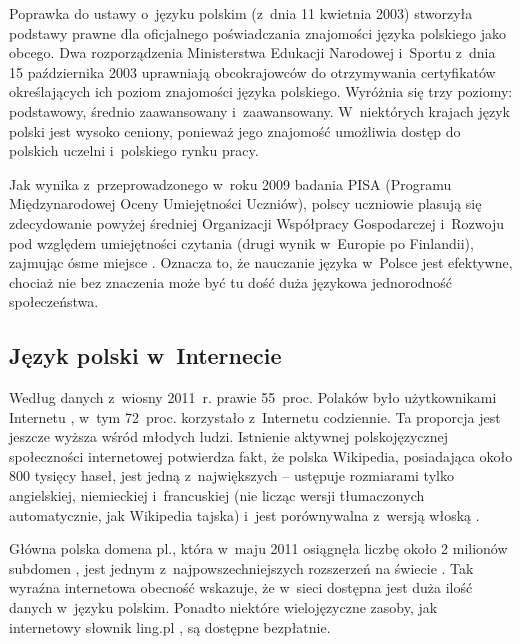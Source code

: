 \begin{multicols}{2}
Poprawka do ustawy o~języku polskim (z~dnia 11 kwietnia 2003)
stworzyła podstawy prawne dla oficjalnego poświadczania znajomości
języka polskiego jako obcego. Dwa rozporządzenia Ministerstwa
Edukacji Narodowej i~Sportu z~dnia 15 października 2003 uprawniają
obcokrajowców do otrzymywania certyfikatów określających ich
poziom znajomości języka polskiego. Wyróżnia się trzy poziomy:
podstawowy, średnio zaawansowany i~zaawansowany. W~niektórych
krajach język polski jest wysoko ceniony, ponieważ jego znajomość
umożliwia dostęp do polskich uczelni i~polskiego rynku pracy. 


Jak wynika z~przeprowadzonego w~roku 2009 badania PISA (Programu
Międzynarodowej Oceny Umiejętności Uczniów), polscy uczniowie
plasują się zdecydowanie powyżej średniej Organizacji Współpracy
Gospodarczej i~Rozwoju pod względem umiejętności czytania (drugi
wynik w~Europie po Finlandii), zajmując ósme miejsce \cite{Oecd1}.
Oznacza to, że nauczanie języka w~Polsce jest efektywne, chociaż
nie bez znaczenia może być tu dość duża językowa jednorodność
społeczeństwa. 

\subsection[Język polski w~Internecie]{Język polski w~Internecie}
Według danych z~wiosny 2011~r. prawie 55~proc. Polaków było
użytkownikami Internetu \cite{Rp1}, w~tym 72~proc. korzystało
z~Internetu codziennie. Ta proporcja jest jeszcze wyższa wśród
młodych ludzi. Istnienie aktywnej polskojęzycznej społeczności
internetowej potwierdza fakt, że polska Wikipedia, posiadająca
około 800 tysięcy haseł, jest jedną z~największych – ustępuje
rozmiarami tylko angielskiej, niemieckiej i~francuskiej (nie licząc
wersji tłumaczonych automatycznie, jak Wikipedia tajska) i~jest
porównywalna z~wersją włoską \cite{Wiki1}. 


Główna polska domena pl., która w~maju 2011 osiągnęła liczbę
około 2 milionów subdomen \cite{Krd1}, jest jednym
z~najpowszechniejszych rozszerzeń na świecie \cite{ebrands1}. Tak
wyraźna internetowa obecność wskazuje, że w~sieci dostępna jest
duża ilość danych w~języku polskim. Ponadto niektóre
wielojęzyczne zasoby, jak internetowy słownik ling.pl \cite{ling1},
są dostępne bezpłatnie. 


\end{multicols}
